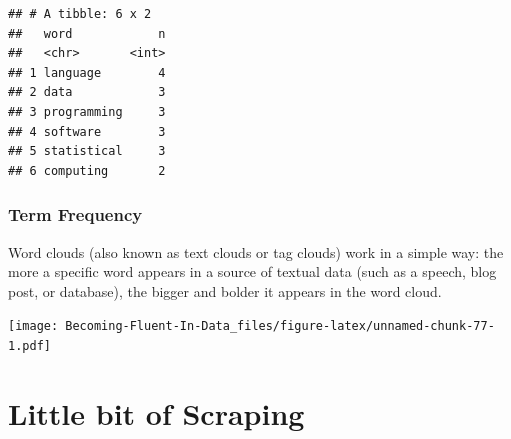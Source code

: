 \documentclass[
]{book}
\begin{document}
\begin{verbatim}
## # A tibble: 6 x 2
##   word            n
##   <chr>       <int>
## 1 language        4
## 2 data            3
## 3 programming     3
## 4 software        3
## 5 statistical     3
## 6 computing       2
\end{verbatim}

\hypertarget{term-frequency}{%
\subsubsection{Term Frequency}\label{term-frequency}}

Word clouds (also known as text clouds or tag clouds) work in a simple way: the more a specific word appears in a source of textual data (such as a speech, blog post, or database), the bigger and bolder it appears in the word cloud.

\texttt{[image: Becoming-Fluent-In-Data\_files/figure-latex/unnamed-chunk-77-1.pdf]}

\hypertarget{little-bit-of-scraping}{%
\section{Little bit of Scraping}\label{little-bit-of-scraping}}
\end{document}
